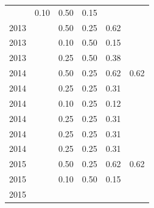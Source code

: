 \begin{table}[H]
\begin{tabular}{| l | c | c | c | c | c |}
          &
          0.10
          &
          0.50
          &
          0.15
          &
          \\
            2013
          &
          
          &
          0.50
          &
          0.25
          &
          0.62
          &
          \\
            2013
          &
          
          &
          0.10
          &
          0.50
          &
          0.15
          &
          \\
            2013
          &
          
          &
          0.25
          &
          0.50
          &
          0.38
          &
          \\
\hline
            2014
          &
          
          &
          0.50
          &
          0.25
          &
          0.62
          &
            {\color{blue} 0.62}
          \\
            2014
          &
          
          &
          0.25
          &
          0.25
          &
          0.31
          &
          \\
            2014
          &
          
          &
          0.10
          &
          0.25
          &
          0.12
          &
          \\
            2014
          &
          
          &
          0.25
          &
          0.25
          &
          0.31
          &
          \\
            2014
          &
          
          &
          0.25
          &
          0.25
          &
          0.31
          &
          \\
            2014
          &
          
          &
          0.25
          &
          0.25
          &
          0.31
          &
          \\
\hline
            2015
          &
          
          &
          0.50
          &
          0.25
          &
          0.62
          &
            {\color{blue} 0.62}
          \\
            2015
          &
          
          &
          0.10
          &
          0.50
          &
          0.15
          &
          \\
            2015
          &
          

\end{tabular}
\end{table}
